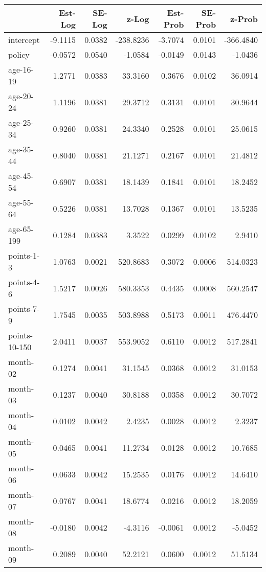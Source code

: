 \documentclass[10pt]{article}
\begin{document}
\begin{table}[ht]
\centering
\begin{tabular}{lrrrrrr}
  \hline
 & Est-Log & SE-Log & z-Log & Est-Prob & SE-Prob & z-Prob \\ 
  \hline
intercept & -9.1115 & 0.0382 & -238.8236 & -3.7074 & 0.0101 & -366.4840 \\ 
  policy & -0.0572 & 0.0540 & -1.0584 & -0.0149 & 0.0143 & -1.0436 \\ 
  age-16-19 & 1.2771 & 0.0383 & 33.3160 & 0.3676 & 0.0102 & 36.0914 \\ 
  age-20-24 & 1.1196 & 0.0381 & 29.3712 & 0.3131 & 0.0101 & 30.9644 \\ 
  age-25-34 & 0.9260 & 0.0381 & 24.3340 & 0.2528 & 0.0101 & 25.0615 \\ 
  age-35-44 & 0.8040 & 0.0381 & 21.1271 & 0.2167 & 0.0101 & 21.4812 \\ 
  age-45-54 & 0.6907 & 0.0381 & 18.1439 & 0.1841 & 0.0101 & 18.2452 \\ 
  age-55-64 & 0.5226 & 0.0381 & 13.7028 & 0.1367 & 0.0101 & 13.5235 \\ 
  age-65-199 & 0.1284 & 0.0383 & 3.3522 & 0.0299 & 0.0102 & 2.9410 \\ 
  points-1-3 & 1.0763 & 0.0021 & 520.8683 & 0.3072 & 0.0006 & 514.0323 \\ 
  points-4-6 & 1.5217 & 0.0026 & 580.3353 & 0.4435 & 0.0008 & 560.2547 \\ 
  points-7-9 & 1.7545 & 0.0035 & 503.8988 & 0.5173 & 0.0011 & 476.4470 \\ 
  points-10-150 & 2.0411 & 0.0037 & 553.9052 & 0.6110 & 0.0012 & 517.2841 \\ 
  month-02 & 0.1274 & 0.0041 & 31.1545 & 0.0368 & 0.0012 & 31.0153 \\ 
  month-03 & 0.1237 & 0.0040 & 30.8188 & 0.0358 & 0.0012 & 30.7072 \\ 
  month-04 & 0.0102 & 0.0042 & 2.4235 & 0.0028 & 0.0012 & 2.3237 \\ 
  month-05 & 0.0465 & 0.0041 & 11.2734 & 0.0128 & 0.0012 & 10.7685 \\ 
  month-06 & 0.0633 & 0.0042 & 15.2535 & 0.0176 & 0.0012 & 14.6410 \\ 
  month-07 & 0.0767 & 0.0041 & 18.6774 & 0.0216 & 0.0012 & 18.2059 \\ 
  month-08 & -0.0180 & 0.0042 & -4.3116 & -0.0061 & 0.0012 & -5.0452 \\ 
  month-09 & 0.2089 & 0.0040 & 52.2121 & 0.0600 & 0.0012 & 51.5134 \\ 

\end{tabular}
\end{table}
\end{document}
